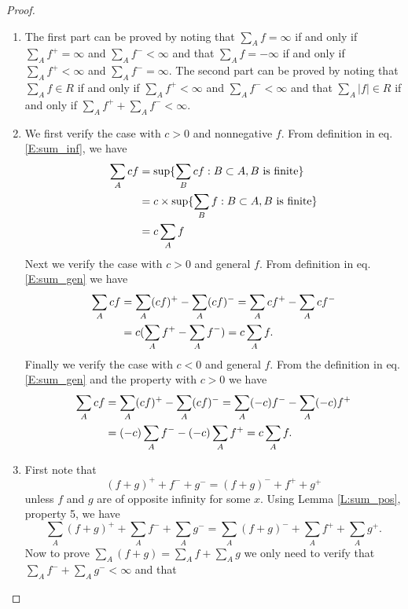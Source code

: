 \begin{proof}
\begin{enumerate}
\item The first part can be proved by noting that $\sum_A f=\infty$ if and only
  if $\sum_A f^+=\infty$ and $\sum_A f^-<\infty$ and that $\sum_A f=-\infty$ if 
  and only if $\sum_A f^+<\infty$ and $\sum_A f^-=\infty$.
  The second part can be proved by noting that $\sum_A f\in R$ if and only if 
  $\sum_A f^+<\infty$ and $\sum_A f^-<\infty$ and that $\sum_A |f|\in R$ if and
  only if $\sum_A f^+ +\sum_A f^-<\infty$.
\item We first verify the case with $c>0$ and nonnegative $f$. From definition
  in eq. \ref{E:sum_inf}, we have
  \begin{align*}
    \sum_A cf &= \sup\{ \sum_B cf: B\subset A, \text{$B$ is finite} \} \notag \\
              &= c \times \sup\{ \sum_B f: B\subset A, \text{$B$ is finite} \}
                \notag \\
              &= c \sum_A f  \notag \\
  \end{align*}
  Next we verify the case with $c>0$ and general $f$. From definition in eq.
  \ref{E:sum_gen} we have
  \begin{align*}
    \sum_A cf&= \sum_A (cf)^+ - \sum_A (cf)^-
               = \sum_A cf^+ - \sum_A cf^-  \notag \\
             &= c(\sum_A f^+ - \sum_A f^-) = c\sum_A f. \notag \\
  \end{align*}
  Finally we verify the case with $c<0$ and general $f$. From the definition in
  eq. \ref{E:sum_gen} and the property with $c>0$ we have
  \begin{align*}
    \sum_A cf&= \sum_A (cf)^+ - \sum_A (cf)^-
             = \sum_A (-c)f^- - \sum_A (-c)f^+  \notag \\
             &= (-c) \sum_A f^- - (-c)\sum_A f^+ =c\sum_A f. \notag \\
  \end{align*}
\item First note that
  \[
    (f+g)^+ + f^- + g^- = (f+g)^- + f^+ + g^+
  \]
  unless $f$ and $g$ are of opposite infinity for some $x$. Using Lemma
  \ref{L:sum_pos}, property 5, we have
  \[
    \sum_A (f+g)^+ + \sum_A f^- + \sum_A g^- 
      = \sum_A (f+g)^- + \sum_A f^+ + \sum_A g^+.
  \]
  Now to prove $\sum_A (f+g)=\sum_A f+\sum_A g$
  we only need to verify that $\sum_A f^- +\sum_A g^-<\infty$ and that

\end{enumerate}
\end{proof}
